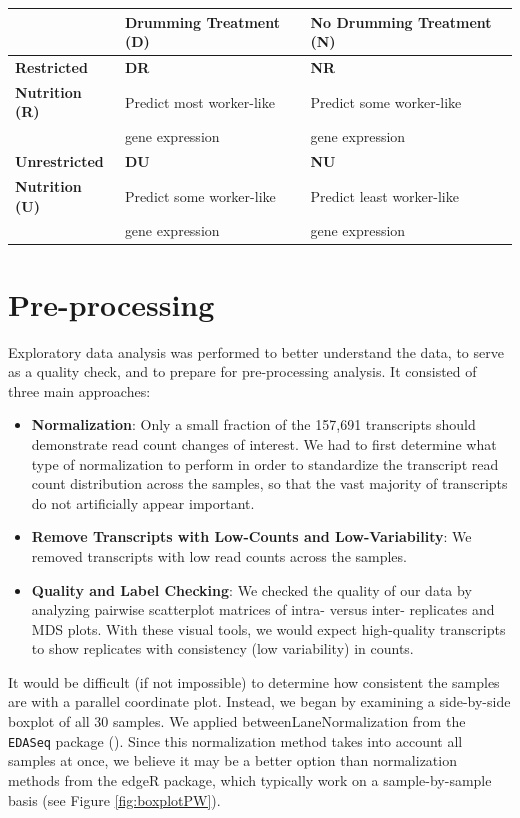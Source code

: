 \documentclass[11pt,a4paper,oldfontcommands,openany]{memoir}
\numberwithin{equation}{section} %
\newcommand{\code}[1]{{\texttt{#1}}}
\begin{document}
\begin{tabular}{|p{2.6cm}|p{5.65cm}|p{5.65cm}|}
 \hline
 & \textbf{Drumming Treatment (D)} & \textbf{No Drumming Treatment (N)} \\ 
 \hline
 \textbf{Restricted} & \textbf{DR} & \textbf{NR} \\ 
 \textbf{Nutrition (R)}& Predict most worker-like & Predict some worker-like \\
 & gene expression & gene expression \\
 \hline
 \textbf{Unrestricted} & \textbf{DU} & \textbf{NU} \\ 
 \textbf{Nutrition (U)} & Predict some worker-like & Predict least worker-like \\
 & gene expression & gene expression \\
 \hline
\end{tabular}

\section{Pre-processing}

Exploratory data analysis was performed to better understand the data, to serve as a quality check, and to prepare for pre-processing analysis. It consisted of three main approaches:

\begin{itemize}

\item \textbf{Normalization}: Only a small fraction of the 157,691 transcripts should demonstrate read count changes of interest. We had to first determine what type of normalization to perform in order to standardize the transcript read count distribution across the samples, so that the vast majority of transcripts do not artificially appear important.

\item \textbf{Remove Transcripts with Low-Counts and Low-Variability}: We removed transcripts with low read counts across the samples.

\item \textbf{Quality and Label Checking}: We checked the quality of our data by analyzing pairwise scatterplot matrices of intra- versus inter- replicates and MDS plots. With these visual tools, we would expect high-quality transcripts to show replicates with consistency (low variability) in counts.

\end{itemize}

It would be difficult (if not impossible) to determine how consistent the samples are with a parallel coordinate plot. Instead, we began by examining a side-by-side boxplot of all 30 samples. We applied betweenLaneNormalization from the \code{EDASeq} package (\citealt{edaseq}). Since this normalization method takes into account all samples at once, we believe it may be a better option than normalization methods from the edgeR package, which typically work on a sample-by-sample basis (see Figure \ref{fig:boxplotPW}).
\end{document}
